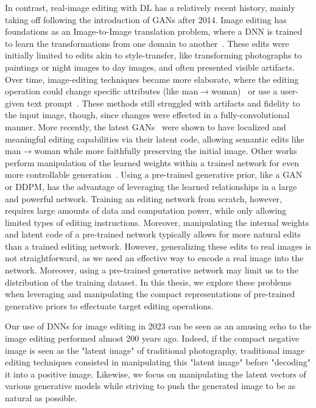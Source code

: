 In contrast, real-image editing with \ac{DL} has a relatively recent history, mainly taking off following the introduction of \ac{GAN}s after 2014.
Image editing has foundations as an Image-to-Image translation problem, where a \ac{DNN} is trained to learn the transformations from 
one domain to another~\citep{isola2017image}. These edits were initially limited to edits akin to style-transfer, like transforming 
photographs to paintings or night images to day images, and often presented visible artifacts.
Over time, image-editing techniques became more elaborate, where the editing operation could change  specific attributes 
(like man$\rightarrow$woman)~\citep{choi2020stargan} or use a user-given text prompt~\citep{li2020manigan}. These methods still struggled with artifacts 
and fidelity to the input image, though, since changes were effected in a fully-convolutional manner. More recently, the latest 
\ac{GAN}s~\citep{karra2019stylegan, karra2020stylegan2} 
were shown to have localized and meaningful editing capabilities via their latent code, allowing semantic edits like man$\rightarrow$woman 
while more faithfully preserving the initial image. Other works perform manipulation of the learned weights within a trained network for 
even more controllable generation~\citep{bau2020rewriting}. Using a pre-trained generative prior, like a \ac{GAN} or \ac{DDPM}, has the advantage 
of leveraging the learned relationships in a large and powerful network. Training an editing network from scratch, however, requires large amounts of data and 
computation power, while only allowing limited types of editing instructions. Moreover, manipulating the internal weights and latent code of a 
pre-trained network typically allows for more natural edits than a trained editing network. However, generalizing these edits to real images is not straightforward, 
as we need an effective way to encode a real image into the network. Moreover, using a pre-trained generative network may limit us to the distribution of the 
training dataset. 
In this thesis, we explore these problems when leveraging
and manipulating the compact representations of pre-trained generative priors to effectuate target editing operations. 

Our use of \ac{DNN}s
for image editing in 2023 can be seen as an amusing echo to the image editing performed almost 200 years ago. Indeed, if the compact negative image 
is seen as the "latent image" of traditional photography, traditional image editing techniques consisted in manipulating this "latent image" before "decoding" 
it into a positive image. Likewise, 
we focus on manipulating the latent vectors of various generative models while striving to push the generated image to be as natural as possible.


